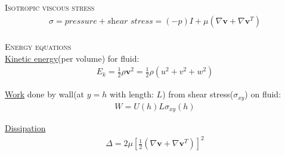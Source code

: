 \documentclass[11pt,a4paper,english]{article}
\begin{document}
{\scshape Isotropic viscous stress} \\
\begin{align*}
\sigma = pressure + \textit{shear stress} =  (-p)I + \mu (\nabla \mathbf{v}  + \nabla \mathbf{v}^T  )
\end{align*}
\\[2ex]

{\scshape Energy equations} \\

\underline{Kinetic energy}(per volume) for fluid:
\begin{align*}
E_k = \frac{1}{2} \rho \mathbf{v}^2 = \frac{1}{2} \rho (u^2 + v^2 + w^2) 
\end{align*}

\underline{Work} done by wall(at $y=h$ with length: $L$) from shear stress($\sigma_{xy}$) on fluid:
\begin{align*}
W = U(h) L \sigma_{xy}(h)
\end{align*}

\underline{Dissipation}
\begin{align*}
\Delta = 2 \mu [\frac{1}{2} (\nabla \mathbf{v}  + \nabla \mathbf{v}^T  ) ]^2
\end{align*}
\end{document}
